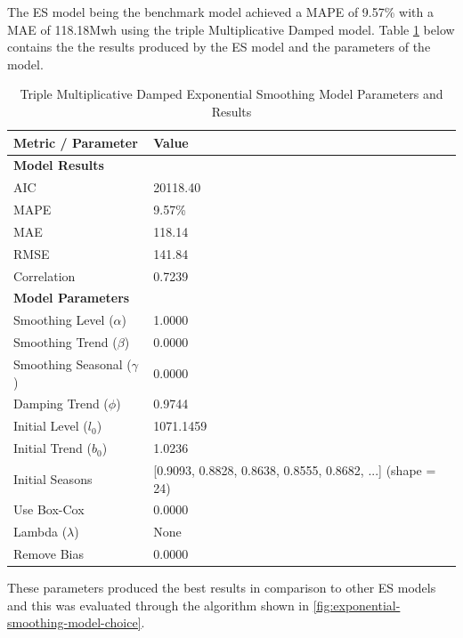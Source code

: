 The ES model being the benchmark model achieved a MAPE of 9.57\% with a MAE of 118.18Mwh using the triple Multiplicative Damped model. Table \ref{tab:exp_smoothing_results} below contains the the results produced by the ES model and the parameters of the model. 
\begin{table}[h]
	\centering
	
	\begin{tabular}{ll}
		\hline
		\textbf{Metric / Parameter} & \textbf{Value} \\
		\hline
		\multicolumn{2}{l}{\textbf{Model Results}} \\
		AIC & 20118.40 \\
		MAPE &  9.57\% \\
		MAE & 118.14 \\
		RMSE & 141.84 \\
		Correlation & 0.7239\\
		\hline
		\multicolumn{2}{l}{\textbf{Model Parameters}} \\
		Smoothing Level ($\alpha$) & 1.0000 \\
		Smoothing Trend ($\beta$) & 0.0000 \\
		Smoothing Seasonal ($\gamma$) & 0.0000 \\
		Damping Trend ($\phi$) & 0.9744 \\
		Initial Level ($l_0$) & 1071.1459 \\
		Initial Trend ($b_0$) & 1.0236 \\
		Initial Seasons & [0.9093, 0.8828, 0.8638, 0.8555, 0.8682, ...] (shape = 24) \\
		Use Box-Cox & 0.0000 \\
		Lambda ($\lambda$) & None \\
		Remove Bias & 0.0000 \\
		\hline
	\end{tabular}
	\caption{Triple Multiplicative Damped Exponential Smoothing Model Parameters and Results}
	\label{tab:exp_smoothing_results}
\end{table}
These parameters produced the best results in comparison to other ES models and this was evaluated through the algorithm shown in  \ref{fig:exponential-smoothing-model-choice}. 
